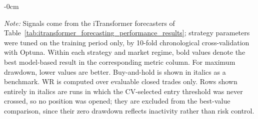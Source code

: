 \begin{table}[H]
\begin{adjustwidth}{-\extralength}{0cm}
\begin{threeparttable}
\begin{tablenotes}[flushleft]
\footnotesize
\item \textit{Note:} Signals come from the iTransformer forecasters of Table~\ref{tab:itransformer_forecasting_performance_results}; strategy parameters were tuned on the training period only, by 10-fold chronological cross-validation with Optuna. Within each strategy and market regime, bold values denote the best model-based result in the corresponding metric column. For maximum drawdown, lower values are better. Buy-and-hold is shown in italics as a benchmark. WR is computed over evaluable closed trades only. Rows shown entirely in italics are runs in which the CV-selected entry threshold was never crossed, so no position was opened; they are excluded from the best-value comparison, since their zero drawdown reflects inactivity rather than risk control.
\end{tablenotes}
\end{threeparttable}
\end{adjustwidth}
\end{table}